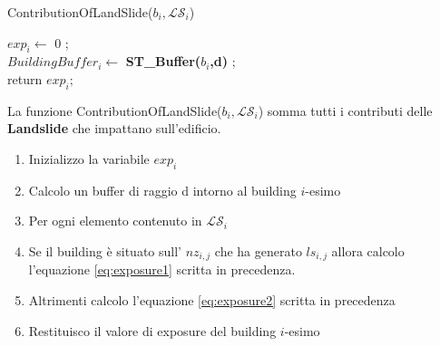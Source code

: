 \begin{algorithm}[H]
	
	\IncMargin{1em}
	\caption{ContributionOfLandSlide($b_i , \mathcal{LS}_i $) }
	\label{alg:four}
	\BlankLine
	\SetAlgoNoLine
	
	$ exp_i \leftarrow$ 0 ;\\
	$ BuildingBuffer_i  \leftarrow $ \textbf{ST\_Buffer($b_i$,d)} ;\\
	return $exp_i;$
\end{algorithm}
La funzione ContributionOfLandSlide($b_i , \mathcal{LS}_i $) somma tutti i contributi delle \textbf{Landslide} che impattano sull'edificio.
\begin{enumerate}
	\item Inizializzo la variabile $exp_i$ 
	\item Calcolo un buffer di raggio d intorno al building $i$-esimo
	\item Per ogni elemento contenuto in $\mathcal{LS}_i $
	\item Se il building è situato sull' $nz_{i,j}$ che ha generato $ls_{i,j}$ allora calcolo l'equazione \ref{eq:exposure1} scritta in precedenza.
	\item Altrimenti calcolo l'equazione \ref{eq:exposure2} scritta in precedenza 
	\item Restituisco il valore di exposure del building $i$-esimo
\end{enumerate}
